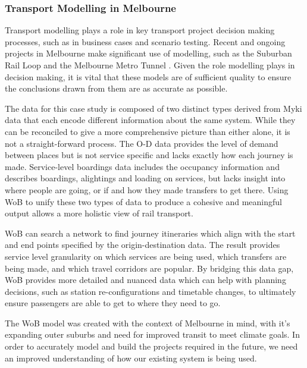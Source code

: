 \subsubsection{Transport Modelling in Melbourne}

Transport modelling plays a role in key transport project decision making processes, such as in business cases and scenario testing. Recent and ongoing projects in Melbourne make significant use of modelling, such as the Suburban Rail Loop and the Melbourne Metro Tunnel \cite{victorianparliamentarybudgetofficeSuburbanRailLoop2024, victoriandepartmentofeconomicdevelopmentjobstransportandresourcesMelbourneMetroBusiness2016}. Given the role modelling plays in decision making, it is vital that these models are of sufficient quality to ensure the conclusions drawn from them are as accurate as possible. 

The data for this case study is composed of two distinct types derived from Myki data that each encode different information about the same system. While they can be reconciled to give a more comprehensive picture than either alone, it is not a straight-forward process. The O-D data provides the level of demand between places but is not service specific and lacks exactly how each journey is made. Service-level boardings data includes the occupancy information and describes boardings, alightings and loading on services, but lacks insight into where people are going, or if and how they made transfers to get there. Using WoB to unify these two types of data to produce a cohesive and meaningful output allows a more holistic view of rail transport. 

WoB can search a network to find journey itineraries which align with the start and end points specified by the origin-destination data. The result provides service level granularity on which services are being used, which transfers are being made, and which travel corridors are popular. By bridging this data gap, WoB provides more detailed and nuanced data which can help with planning decisions, such as station re-configurations and timetable changes, to ultimately ensure passengers are able to get to where they need to go. 

The WoB model was created with the context of Melbourne in mind, with it's expanding outer suburbs and need for improved transit to meet climate goals. In order to accurately model and build the projects required in the future, we need an improved understanding of how our existing system is being used. 

